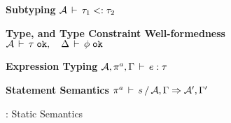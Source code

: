 \begin{figure*}[t]
%
\textbf{Subtyping}  \; \fbox
  {\({\mathcal{A}}\,\vdash\,\tau_1 <: \tau_2\)}\\

%
\bigskip

\textbf{Type, and Type Constraint Well-formedness}  \; \fbox
  {\({\mathcal{A}}\,\vdash\,\tau \; \texttt{ok}, \quad 
     \Delta\,\vdash\,\phi \; \texttt{ok}\)}\\

%
\bigskip

\textbf{Expression Typing}  \; \fbox
  {\({\mathcal{A}},\pi^a,\Gamma\,\vdash\,e:\tau\)}\\

%
\bigskip

\textbf{Statement Semantics}  \; \fbox
  {\(\pi^a \, \vdash \, s \,/\, {\mathcal{A}},\Gamma \Rightarrow {\mathcal{A}}',\Gamma'\)}\\


\caption{\fbname: Static Semantics}
\label{fig:fb-staticsem}
\end{figure*}


